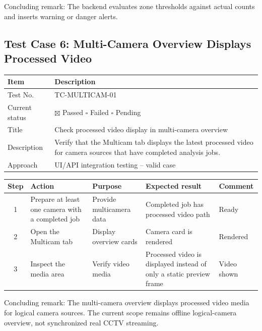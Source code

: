 \documentclass[12pt,a4paper]{report}
\begin{document}
Concluding remark: The backend evaluates zone thresholds against actual counts and inserts warning or danger alerts.

\subsection{Test Case 6: Multi-Camera Overview Displays Processed Video}
\begin{longtable}{|p{4cm}|p{10cm}|}
\hline
\rowcolor{HeaderBlue}\textbf{Item} & \textbf{Description} \\
\hline
Test No. & TC-MULTICAM-01 \\
\hline
Current status & $\boxtimes$ Passed \quad $\square$ Failed \quad $\square$ Pending \\
\hline
Title & Check processed video display in multi-camera overview \\
\hline
Description & Verify that the Multicam tab displays the latest processed video for camera sources that have completed analysis jobs. \\
\hline
Approach & UI/API integration testing -- valid case \\
\hline
\end{longtable}

\begin{longtable}{|c|p{3.6cm}|p{3.6cm}|p{3.6cm}|p{2cm}|}
\hline
\rowcolor{HeaderBlue}
\textbf{Step} & \textbf{Action} & \textbf{Purpose} & \textbf{Expected result} & \textbf{Comment} \\
\hline
1 & Prepare at least one camera with a completed job & Provide multicamera data & Completed job has processed video path & Ready \\
\hline
2 & Open the Multicam tab & Display overview cards & Camera card is rendered & Rendered \\
\hline
3 & Inspect the media area & Verify video media & Processed video is displayed instead of only a static preview frame & Video shown \\
\hline
\end{longtable}

Concluding remark: The multi-camera overview displays processed video media for logical camera sources. The current scope remains offline logical-camera overview, not synchronized real CCTV streaming.
\end{document}

